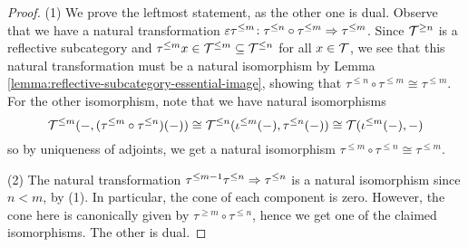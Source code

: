 \begin{proof}
(1) We prove the leftmost statement, as the other one is dual. Observe that we have a natural transformation \(\varepsilon\tau^{\leq m}\!: \tau^{\leq n}\circ\tau^{\leq m} \Rightarrow \tau^{\leq m}\).
Since \(\mathcal{T}^{\geq n}\) is a reflective subcategory and \(\tau^{\leq m}x\in\mathcal{T}^{\leq m}\subseteq\mathcal{T}^{\leq n}\) for all \(x\in\mathcal{T}\), we see that this natural transformation
must be a natural isomorphism by Lemma \ref{lemma:reflective-subcategory-essential-image}, showing that \(\tau^{\leq n}\circ\tau^{\leq m} \cong \tau^{\leq m}\). For the
other isomorphism, note that we have natural isomorphisms
\[ \mathcal{T}^{\leq m}(-, (\tau^{\leq m}\circ\tau^{\leq n})(-)) \cong \mathcal{T}^{\leq n}(\iota^{\leq m}(-),\tau^{\leq n}(-)) \cong \mathcal{T}(\iota^{\leq m}(-), -) \]
so by uniqueness of adjoints, we get a natural isomorphism \( \tau^{\leq m}\circ\tau^{\leq n}\cong\tau^{\leq m} \).

(2) The natural transformation \( \tau^{\leq m-1}\tau^{\leq n} \Rightarrow \tau^{\leq n} \) is a natural isomorphism since \(n < m\), by (1). In particular, the cone of each component is zero.
However, the cone here is canonically given by \(\tau^{\geq m}\circ \tau^{\leq n}\), hence we get one of the claimed isomorphisms. The other is dual.


\end{proof}
